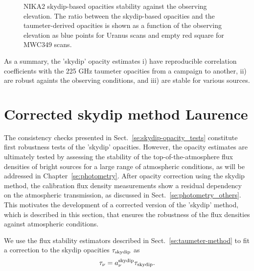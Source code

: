 \begin{figure}[ht!]
\begin{center}
    \caption[NIKA2 skydip-based opacity stability against observing elevations]{NIKA2
    skydip-based opacities stability against the observing elevation. The ratio between the skydip-based opacities and the taumeter-derived opacities is shown as a function of the observing elevation as blue points for Uranus scans and empty red square for MWC349 scans.} 
\label{fig:skydip-to-taumeter-ratio-vs-elev}
\end{center}
\end{figure}

As a summary, the 'skydip' opacity estimates i) have reproducible
correlation coefficients with the 225 GHz taumeter opacities from a
campaign to another, ii) are robust againts the observing conditions,
and iii) are stable for various sources. 



\section{Corrected skydip method {\color{YellowGreen} Laurence}}
\label{se:corrected-skydip}

The consistency checks presented in
Sect.~\ref{se:skydip-opacity_tests} constitute first
robustness tests of the 'skydip' opacities. However, the opacity
estimates are ultimately tested by assessing the
stability of the top-of-the-atmosphere flux densities of bright sources for a large
range of atmospheric conditions, as will be addressed in
Chapter~\ref{se:photometry}. After opacity correction using the
skydip method, the calibration flux density measurements show a
residual dependency on the atmospheric transmission, as discussed in
Sect.~\ref{se:photometry_others}. This motivates the development of a
corrected version of the 'skydip' method, which is described in this
section, that ensures the robustness of the flux densities against
atmospheric conditions.


We use the flux stability estimators described in
Sect.~\ref{se:taumeter-method} to fit a correction to the skydip
opacities $\tau_{\rm{skydip}}$ as
\begin{equation}  
  \tau_\nu =  a_\nu^{\rm{skydip}}\tau_{\rm{skydip}}.
  \label{eq:corrected_skydip}
\end{equation}

